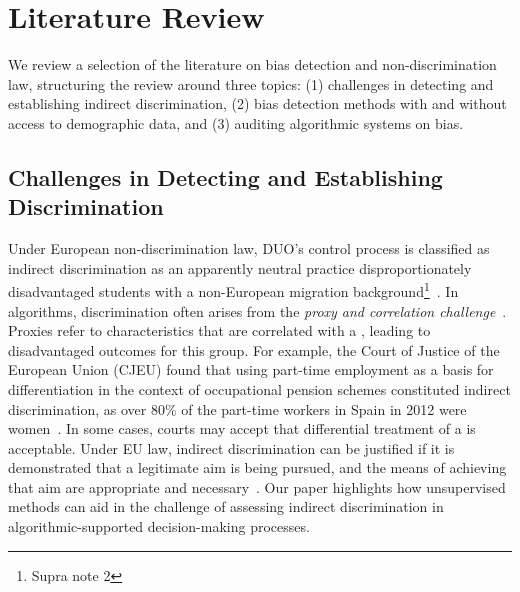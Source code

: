 \section{Literature Review}
\label{sec:lit}
We review a selection of the literature on bias detection and non-discrimination law, structuring the review around three topics: (1) challenges in detecting and establishing indirect discrimination, (2) bias detection methods with and without access to demographic data, and (3) auditing algorithmic systems on bias.

\subsection{Challenges in Detecting and Establishing Discrimination}

Under European non-discrimination law, DUO's control process is classified as indirect discrimination as an apparently neutral practice disproportionately disadvantaged students with a non-European migration background\footnote{Supra note 2}~\cite{BilkaKaufhaus}. In algorithms, discrimination often arises from the \emph{proxy and correlation challenge}~\cite{EC_algorithmicdiscrimination}. Proxies refer to characteristics that are correlated with a {\protectedgroup}, leading to disadvantaged outcomes for this group. For example, the Court of Justice of the European Union (CJEU) found that using part-time employment as a basis for differentiation in the context of occupational pension schemes constituted indirect discrimination, as over 80\% of the part-time workers in Spain in 2012 were women~\citep{MorenoInstitutoNacional}. 
In some cases, courts may accept that differential treatment of a {\protectedgroup} is acceptable. Under EU law, indirect discrimination can be justified if it is demonstrated that a legitimate aim is being pursued, and the means of achieving that aim are appropriate and necessary~\citep{EmploymentEqualityDirective,RacialEqualityDirective,GoodsandServicesDirective,RecastGenderEqualityDirective}. Our paper highlights how unsupervised methods can aid in the challenge of assessing indirect discrimination in algorithmic-supported decision-making processes.

